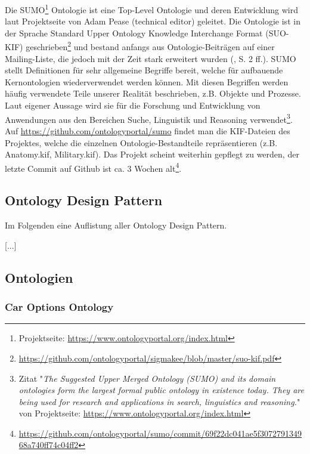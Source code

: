 \documentclass{article}
\begin{document}
Die SUMO\footnote{Projektseite: \url{https://www.ontologyportal.org/index.html}} Ontologie ist eine Top-Level Ontologie und deren Entwicklung wird laut Projektseite von Adam Pease (technical editor) geleitet.
Die Ontologie ist in der Sprache Standard Upper Ontology Knowledge Interchange Format (SUO-KIF) geschrieben\footnote{\url{https://github.com/ontologyportal/sigmakee/blob/master/suo-kif.pdf}} und
bestand anfangs aus Ontologie-Beiträgen auf einer Mailing-Liste, die jedoch mit der Zeit stark erweitert wurden (\cite{niles2001towards}, S. 2 ff.).
SUMO stellt Definitionen für sehr allgemeine Begriffe bereit, welche für aufbauende Kernontologien wiederverwendet werden können.
Mit diesen Begriffen werden häufig verwendete Teile unserer Realität beschrieben, z.B. Objekte und Prozesse.
Laut eigener Aussage wird sie für die Forschung und Entwicklung von Anwendungen aus den Bereichen Suche, Linguistik und Reasoning verwendet\footnote{Zitat "\textit{The Suggested Upper Merged Ontology (SUMO) and its domain ontologies form the largest formal public ontology in existence today. They are being used for research and applications in search, linguistics and reasoning.}" von Projektseite: \url{https://www.ontologyportal.org/index.html}}.
Auf \url{https://github.com/ontologyportal/sumo} findet man die KIF-Dateien des Projektes, welche die einzelnen Ontologie-Bestandteile repräsentieren (z.B. Anatomy.kif, Military.kif).
Das Projekt scheint weiterhin gepflegt zu werden, der letzte Commit auf Github ist ca. 3 Wochen alt\footnote{\url{https://github.com/ontologyportal/sumo/commit/69f22dc041ae5f307279134968a740ff74c04ff2}}.

\subsection{Ontology Design Pattern}

Im Folgenden eine Auflistung aller Ontology Design Pattern.

[...]

\subsection{Ontologien}


\subsubsection{Car Options Ontology}
\end{document}
